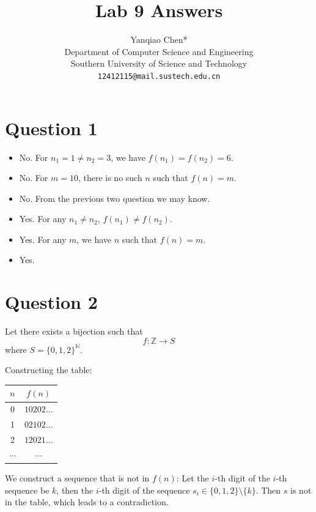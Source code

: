 \documentclass[a4paper, UTF-8]{article}
\theoremstyle{plain}
\begin{document}
\title{\bf{Lab 9 Answers}}
\author{Yanqiao Chen*\\ 
  Department of Computer Science and Engineering\\
  Southern University of Science and Technology\\
  \texttt{12412115@mail.sustech.edu.cn}
  }
\maketitle

\section{Question 1} 

\begin{itemize}
  \item No. For $n_1 = 1 \ne n_2 = 3$, we have $f(n_1) = f(n_2) = 6$. 
  \item No. For $m = 10$, there is no such $n$ such that $f(n) = m$. 
  \item No. From the previous two question we may know. 
  \item Yes. For any $n_1 \ne n_2$, $f(n_1) \ne f(n_2)$. 
  \item Yes. For any $m$, we have $n$ such that $f(n) = m$. 
  \item Yes.
\end{itemize}

\section{Question 2} 

Let there exists a bijection such that 
$$
f:\mathbb{Z} \to S
$$
where $S = \{0, 1, 2\}^\mathbb{N}$. 

Constructing the table: 

\begin{center}
  \begin{tabular}{c|c}
    $n$ & $f(n)$ \\
    \hline
    0 & $10202\ldots$ \\
    1 & $02102\ldots$\\
    2 & $12021\ldots$ \\
    $\cdots$ & $\cdots$ \\
  \end{tabular}
\end{center}

We construct a sequence that is not in $f(n)$: Let the $i$-th digit of the $i$-th sequence be $k$, then the $i$-th digit of the sequence $s_i \in \{0, 1, 2\} \setminus \{k\}$. Then $s$ is not in the table, which leads to a contradiction.
\end{document}
